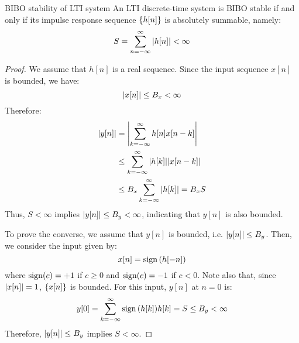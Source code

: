 \documentclass[../../main/main.tex]{subfiles}
\begin{document}
\begin{corollary}{BIBO stability of LTI system}{}
    An LTI discrete-time system is BIBO stable if and only if its impulse response sequence \( \qty{h[n]} \) is absolutely summable, namely:
    \begin{equation}
        S
        =
        \sum_{n = -\infty}^{\infty} \abs{h[n]}
        <
        \infty
        \label{eq:L06_S03_1}
    \end{equation}

    \begin{proof}
        We assume that \( h[n] \) is a real sequence. Since the input sequence \( x[n] \) is bounded, we have:
        \begin{equation}
            \abs{x[n]}
            \le
            B_{x}
            <
            \infty
            \label{eq:L06_S04_1}
        \end{equation}
        Therefore:
        \begin{align}
            \abs{y[n]}
            &=
                \abs{\sum_{k = -\infty}^{\infty} h[n]x[n-k]}    \nonumber   \\
            &\le
                \sum_{k = -\infty}^{\infty} \abs{h[k]} \abs{x[n-k]} \nonumber   \\
            &\le
                B_{x} \sum_{k = -\infty}^{\infty} \abs{h[k]} = B_{x}S
        \end{align}
        Thus, \( S < \infty \) implies \( \abs{y[n]} \le B_{y} < \infty \), indicating that \( y[n] \) is also bounded.

        To prove the converse, we assume that \( y[n] \) is bounded, i.e. \( \abs{y[n]} \le B_{y} \). Then, we consider the input given by:
        \begin{equation}
            x[n]
            =
            \operatorname{sign}\qty(h[-n])
            \label{eq:L06_S05_1}
        \end{equation}
        where \( \operatorname{sign}(c) = +1 \) if \( c \ge 0 \) and \( \operatorname{sign}(c) = -1 \) if \( c < 0 \). Note also that, since \( \abs{x[n]} = 1 \), \( \qty{x[n]} \) is bounded. For this input, \( y[n] \) at \( n = 0 \) is:
        \begin{equation}
            y[0]
            =
            \sum_{k = -\infty}^{\infty} \operatorname{sign}\qty(h[k]) h[k]
            =
            S
            \le
            B_{y}
            <
            \infty
            \label{eq:L06_S06_1}
        \end{equation}
        Therefore, \( \abs{y[n]} \le B_{y} \) implies \( S < \infty \).
    \end{proof}
\end{corollary}
\end{document}
